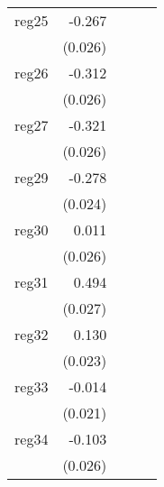 {\begin{longtable}{l*{4}{D{.}{.}{-1}}}
\addlinespace
reg25       &      -0.267\sym{***}&                     &                     &                     \\
            &     (0.026)         &                     &                     &                     \\
\addlinespace
reg26       &      -0.312\sym{***}&                     &                     &                     \\
            &     (0.026)         &                     &                     &                     \\
\addlinespace
reg27       &      -0.321\sym{***}&                     &                     &                     \\
            &     (0.026)         &                     &                     &                     \\
\addlinespace
reg29       &      -0.278\sym{***}&                     &                     &                     \\
            &     (0.024)         &                     &                     &                     \\
\addlinespace
reg30       &       0.011         &                     &                     &                     \\
            &     (0.026)         &                     &                     &                     \\
\addlinespace
reg31       &       0.494\sym{***}&                     &                     &                     \\
            &     (0.027)         &                     &                     &                     \\
\addlinespace
reg32       &       0.130\sym{***}&                     &                     &                     \\
            &     (0.023)         &                     &                     &                     \\
\addlinespace
reg33       &      -0.014         &                     &                     &                     \\
            &     (0.021)         &                     &                     &                     \\
\addlinespace
reg34       &      -0.103\sym{***}&                     &                     &                     \\
            &     (0.026)         &                     &                     &                     \\

\end{longtable}}

